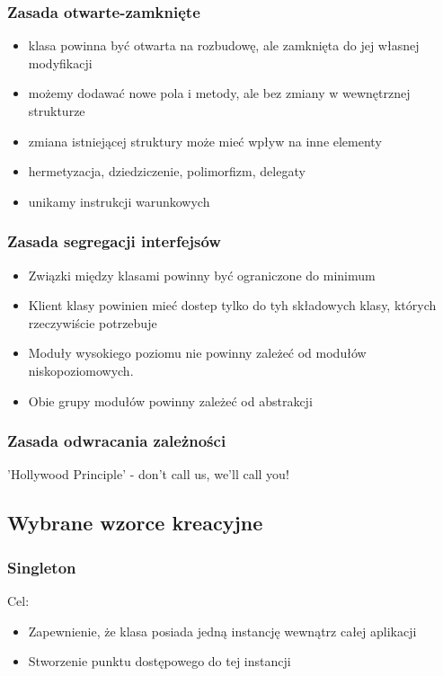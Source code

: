 \documentclass[a4paper]{article}
\begin{document}
    \subsubsection{Zasada otwarte-zamknięte}
    \begin{itemize}
        \item klasa powinna być otwarta na rozbudowę, ale zamknięta do jej własnej modyfikacji
        \item możemy dodawać nowe pola i metody, ale bez zmiany w wewnętrznej strukturze
        \item zmiana istniejącej struktury może mieć wpływ na inne elementy
        \item hermetyzacja, dziedziczenie, polimorfizm, delegaty
        \item unikamy instrukcji warunkowych
    \end{itemize}

    \subsubsection{Zasada segregacji interfejsów}
    \begin{itemize}
        \item Związki między klasami powinny być ograniczone do minimum
        \item Klient klasy powinien mieć dostep tylko do tyh składowych klasy,
        których rzeczywiście potrzebuje
        \item Moduły wysokiego poziomu nie powinny
        zależeć od modułów niskopoziomowych.
        \item Obie grupy modułów powinny zależeć od
        abstrakcji
    \end{itemize}

    \subsubsection{Zasada odwracania zależności}
    'Hollywood Principle' - don't call us, we'll call you!

    \subsection{Wybrane wzorce kreacyjne}

    \subsubsection{Singleton}
    Cel:
    \begin{itemize}
        \item Zapewnienie, że klasa posiada jedną instancję wewnątrz całej aplikacji
        \item Stworzenie punktu dostępowego do tej instancji
    \end{itemize}
\end{document}
